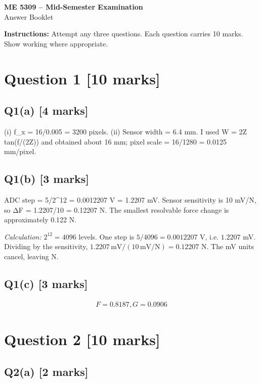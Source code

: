\documentclass[11pt,a4paper]{article}
\begin{document}
\begin{center}
{\Large\bfseries ME 5309 -- Mid-Semester Examination}\\[3pt]
{\large Answer Booklet}\\[8pt]
\end{center}
\textbf{Instructions:} Attempt any three questions. Each question carries 10 marks. Show working where appropriate.
\section*{Question 1 \hfill [10 marks]}
\subsection*{Q1(a) \hfill [4 marks]}

(i) f\_x = 16/0.005 = 3200 pixels.
(ii) Sensor width = 6.4 mm.
I used W = 2Z tan(f/(2Z)) and obtained about 16 mm; pixel scale = 16/1280 = 0.0125 mm/pixel.

\subsection*{Q1(b) \hfill [3 marks]}

ADC step = 5/2\textasciicircum{}12 = 0.0012207 V = 1.2207 mV.
Sensor sensitivity is 10 mV/N, so ΔF = 1.2207/10 = 0.12207 N.
The smallest resolvable force change is approximately 0.122 N.\par\smallskip\textit{Calculation:} $2^{12}=4096$ levels. One step is $5/4096=0.0012207$ V, i.e. $1.2207$ mV. Dividing by the sensitivity, $1.2207\,\mathrm{mV}/(10\,\mathrm{mV/N})=0.12207$ N. The mV units cancel, leaving N.

\subsection*{Q1(c) \hfill [3 marks]}

\[\begin{aligned}F = 0.8187, G = 0.0906\end{aligned}\]

\section*{Question 2 \hfill [10 marks]}
\subsection*{Q2(a) \hfill [2 marks]}
\end{document}
